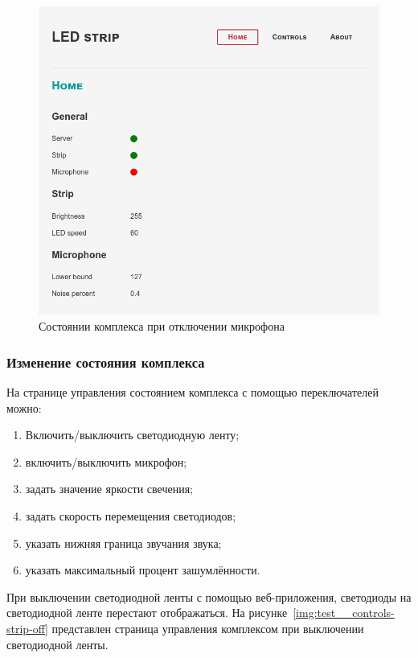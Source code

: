 \begin{figure}[H]
  \centering
  \includegraphics[height=0.3\textheight]{assets/images/practical/test__home-off.png}
  \caption{Состоянии комплекса при отключении микрофона}
  \label{img:test__home-off}
\end{figure}

\subsubsection{Изменение состояния комплекса}

На странице управления состоянием комплекса с помощью переключателей можно:

\begin{enumerate}
  \item Включить/выключить светодиодную ленту;
  \item включить/выключить микрофон;
  \item задать значение яркости свечения;
  \item задать скорость перемещения светодиодов;
  \item указать нижняя граница звучания звука;
  \item указать максимальный процент зашумлённости.
\end{enumerate}

При выключении светодиодной ленты с помощью веб-приложения, светодиоды на светодиодной ленте перестают отображаться. На рисунке~\ref{img:test__controls-strip-off} представлен страница управления комплексом при выключении светодиодной ленты.

